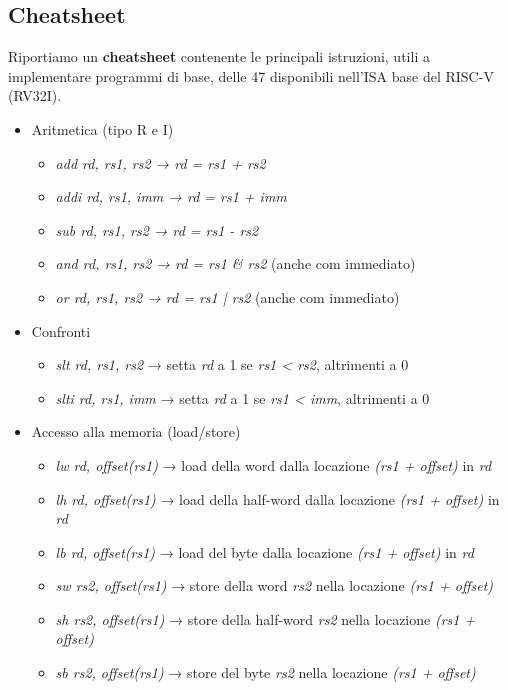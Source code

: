 \subsection{Cheatsheet}
Riportiamo un \textbf{cheatsheet} contenente le principali istruzioni, utili a implementare programmi di base, delle 47 disponibili nell'ISA base del RISC-V (RV32I).
\begin{itemize}
	\item Aritmetica (tipo R e I)
	\begin{itemize}
		\item \textit{add rd, rs1, rs2 → rd = rs1 + rs2}
		\item \textit{addi rd, rs1, imm → rd = rs1 + imm}
		\item \textit{sub rd, rs1, rs2 → rd = rs1 - rs2}
		\item \textit{and rd, rs1, rs2 → rd = rs1 \& rs2} (anche com immediato)
		\item \textit{or rd, rs1, rs2 → rd = rs1 | rs2} (anche com immediato)
	\end{itemize}
	\item Confronti
	\begin{itemize}
		\item \textit{slt rd, rs1, rs2} → setta \textit{rd} a 1 se \textit{rs1 < rs2}, altrimenti a 0
		\item \textit{slti rd, rs1, imm} → setta \textit{rd} a 1 se \textit{rs1 < imm}, altrimenti a 0		
	\end{itemize}
	\item Accesso alla memoria (load/store)
	\begin{itemize}
		\item \textit{lw rd, offset(rs1)} → load della word dalla locazione \textit{(rs1 + offset)} in \textit{rd}
		\item \textit{lh rd, offset(rs1)} → load della half-word dalla locazione \textit{(rs1 + offset)} in \textit{rd}
		\item \textit{lb rd, offset(rs1)} → load del byte dalla locazione \textit{(rs1 + offset)} in \textit{rd}
		\item \textit{sw rs2, offset(rs1)} → store della word \textit{rs2} nella locazione \textit{(rs1 + offset) }
		\item \textit{sh rs2, offset(rs1)} → store della half-word \textit{rs2} nella locazione \textit{(rs1 + offset) }
		\item \textit{sb rs2, offset(rs1)} → store del byte \textit{rs2} nella locazione \textit{(rs1 + offset) }
	\end{itemize}

\end{itemize}
